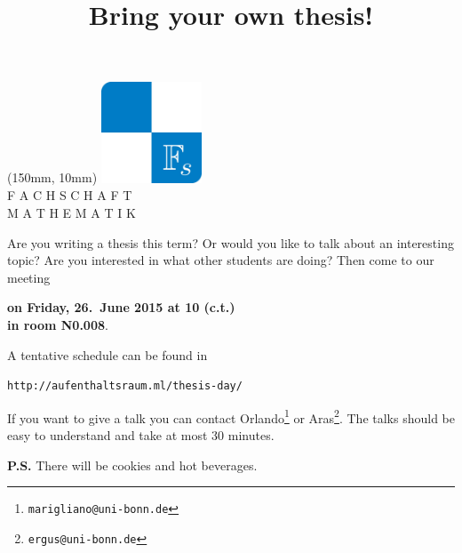 \documentclass[23pt, a4paper, english]{scrartcl}
\title{Bring your own thesis!}
\date{\vspace{-4cm}}
\begin{document}
\maketitle

\begin{textblock*}{50mm}(150mm, 10mm)
\includegraphics[width=30mm]{fs}\\
        \scriptsize
        F A C H S C H A F T\\
        M A T H E M A T I K
\end{textblock*}

Are you writing a thesis this term? Or would you like to talk about an
interesting topic? Are you interested in what other students are doing?
Then come to our meeting
\begin{center}
\textbf{on Friday, 26.\ June 2015 at 10 (c.t.) \\ in room N0.008}.
\end{center}

A tentative schedule can be found in
\begin{center}
\texttt{http://aufenthaltsraum.ml/thesis-day/}
\end{center}

If you want to give a talk you can contact
Orlando\footnote{\texttt{marigliano@uni-bonn.de}} or
Aras\footnote{\texttt{ergus@uni-bonn.de}}. The talks should be easy to
understand and take at most 30 minutes.

\textbf{P.S.} There will be cookies and hot beverages.
\end{document}
